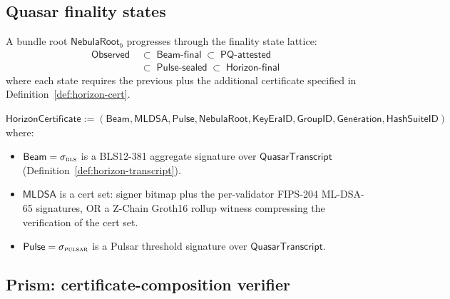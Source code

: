 
\subsection*{Quasar finality states}

\begin{definition}
\label{def:finality-states}
A bundle root $\mathsf{NebulaRoot}_b$ progresses through the finality
state lattice:
\begin{align*}
\mathsf{Observed} &\;\subset\; \mathsf{Beam\text{-}final}
   \;\subset\; \mathsf{PQ\text{-}attested} \\
&\;\subset\; \mathsf{Pulse\text{-}sealed}
   \;\subset\; \mathsf{Horizon\text{-}final}
\end{align*}
where each state requires the previous plus the additional certificate
specified in Definition~\ref{def:horizon-cert}.
\end{definition}

\begin{definition}
\label{def:horizon-cert}
$\mathsf{HorizonCertificate} := (\mathsf{Beam}, \mathsf{MLDSA},
\mathsf{Pulse}, \mathsf{NebulaRoot}, \mathsf{KeyEraID},
\mathsf{GroupID}, \mathsf{Generation}, \mathsf{HashSuiteID})$
where:
\begin{itemize}[nosep]
  \item $\mathsf{Beam} = \sigma_{\textsc{bls}}$ is a BLS12-381 aggregate
        signature over $\mathsf{QuasarTranscript}$
        (Definition~\ref{def:horizon-transcript}).
  \item $\mathsf{MLDSA}$ is a cert set: signer bitmap plus the per-validator
        FIPS-204 ML-DSA-65 signatures, OR a Z-Chain Groth16 rollup
        witness compressing the verification of the cert set.
  \item $\mathsf{Pulse} = \sigma_{\textsc{pulsar}}$ is a Pulsar threshold
        signature over $\mathsf{QuasarTranscript}$.
\end{itemize}
\end{definition}

\subsection*{Prism: certificate-composition verifier}

